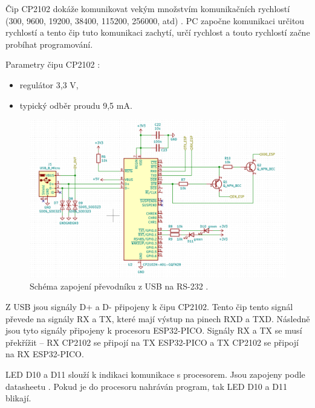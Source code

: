   Čip CP2102 dokáže komunikovat vekým množstvím komunikačních rychlostí (300, 9600, 19200, 38400, 115200, 256000, atd) 
  \cite{CP2102_datasheet}. PC započne komunikaci určitou rychlostí a tento čip tuto komunikaci zachytí, určí rychlost 
  a touto rychlostí začne probíhat programování.

Parametry čipu CP2102 \cite{CP2102_datasheet}: %
\begin{itemize}
    \item regulátor 3,3 V,
    \item typický odběr proudu 9,5 mA.
\end{itemize}

\begin{figure}[!h]
    \begin{center}
      \includegraphics[scale=0.5]{obrazky/CP2102_schema.png}
    \end{center}
    \caption[CP2102 schéma]{Schéma zapojení převodníku z USB na RS-232 \cite{Devkit_schema}.}
\end{figure}

Z USB jsou signály D+ a D- připojeny k čipu CP2102. Tento čip tento signál převede na signály RX a TX, které mají výstup 
na pinech RXD a TXD. Následně jsou tyto signály připojeny k procesoru ESP32-PICO. Signály RX a TX se musí překřížit – RX 
CP2102 se připojí na TX ESP32-PICO a TX CP2102 se připojí na RX ESP32-PICO. 

LED D10 a D11 slouží k indikaci komunikace s procesorem. Jsou zapojeny podle datasheetu \cite{CP2102_datasheet}. Pokud je do 
procesoru nahráván program, tak LED D10 a D11 blikají.

